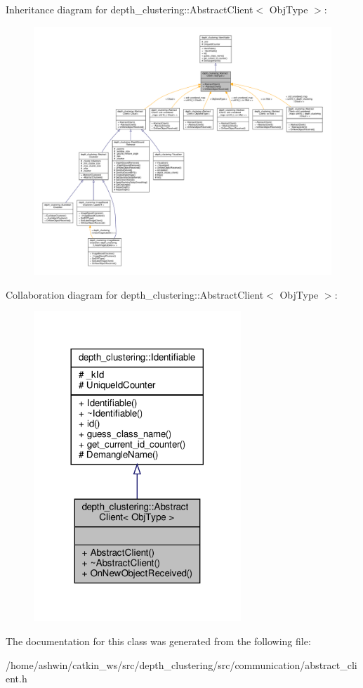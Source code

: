 Inheritance diagram for depth\+\_\+clustering\+:\+:Abstract\+Client$<$ Obj\+Type $>$\+:\nopagebreak
\begin{figure}[H]
\begin{center}
\leavevmode
\includegraphics[width=350pt]{classdepth__clustering_1_1AbstractClient__inherit__graph}
\end{center}
\end{figure}


Collaboration diagram for depth\+\_\+clustering\+:\+:Abstract\+Client$<$ Obj\+Type $>$\+:\nopagebreak
\begin{figure}[H]
\begin{center}
\leavevmode
\includegraphics[width=221pt]{classdepth__clustering_1_1AbstractClient__coll__graph}
\end{center}
\end{figure}


The documentation for this class was generated from the following file\+:\begin{DoxyCompactItemize}
\item 
/home/ashwin/catkin\+\_\+ws/src/depth\+\_\+clustering/src/communication/abstract\+\_\+client.\+h\end{DoxyCompactItemize}
